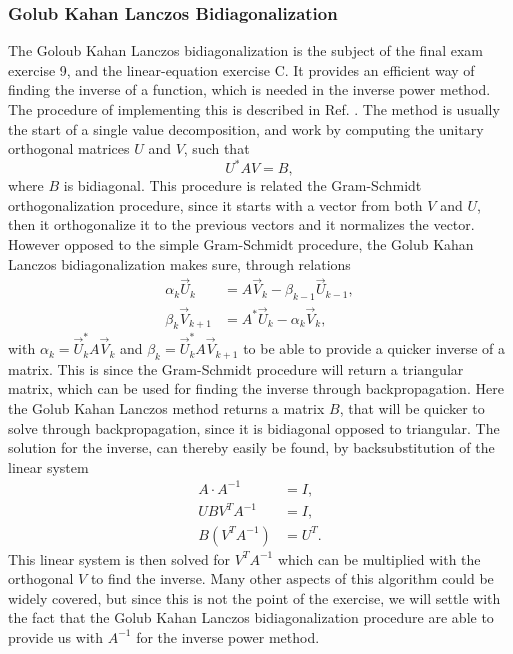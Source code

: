 \documentclass[twocolumn]{article}
\begin{document}
\subsubsection{\label{sec:2.2}Golub Kahan Lanczos Bidiagonalization}
The Goloub Kahan Lanczos bidiagonalization is the subject of the final exam exercise 9, and the linear-equation exercise C. It provides an efficient way of finding the inverse of a function, which is needed in the inverse power method. The procedure of implementing this is described in Ref. \cite{GKL}. The method is usually the start of a single value decomposition, and work by computing the unitary orthogonal matrices $U$ and $V$, such that
\begin{equation}
U^\ast A V = B,
\end{equation}
where $B$ is bidiagonal. This procedure is related the Gram-Schmidt orthogonalization procedure, since it starts with a vector from both $V$ and $U$, then it orthogonalize it to the previous vectors and it normalizes the vector. However opposed to the simple Gram-Schmidt procedure, the Golub Kahan Lanczos bidiagonalization makes sure, through relations
\begin{align}
\alpha_k \vec{U}_{k} &= A\vec{V}_k - \beta_{k-1} \vec{U}_{k-1}, \\
\beta_k \vec{V}_{k+1} &= A^{\ast}\vec{U}_k - \alpha_k \vec{V}_k,
\end{align}
with $\alpha_k = \vec{U}_k^\ast A \vec{V}_k$ and $\beta_k = \vec{U}_k^\ast A \vec{V}_{k+1}$ to be able to provide a quicker inverse of a matrix. This is since the Gram-Schmidt procedure will return a triangular matrix, which can be used for finding the inverse through backpropagation. Here the Golub Kahan Lanczos method returns a matrix $B$, that will be quicker to solve through backpropagation, since it is bidiagonal opposed to triangular. The solution for the inverse, can thereby easily be found, by backsubstitution of the linear system
\begin{align}
A \cdot A^{-1} &= I,\\
U B V^T A^{-1} &= I,\\
B \left(V^T  A^{-1}\right) &= U^T.
\end{align}
This linear system is then solved for $V^T  A^{-1}$ which can be multiplied with the orthogonal $V$ to find the inverse. Many other aspects of this algorithm could be widely covered, but since this is not the point of the exercise, we will settle with the fact that the Golub Kahan Lanczos bidiagonalization procedure are able to provide us with $A^{-1}$ for the inverse power method.
\end{document}
